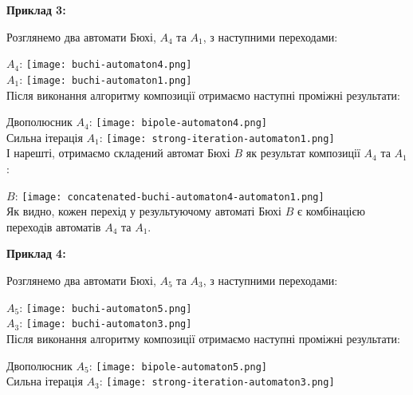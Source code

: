 \documentclass[12pt,a4paper]{article}
\begin{document}
\newpage

\vspace{1em}
\textbf{Приклад 3:}
\vspace{0.5em}

Розглянемо два автомати Бюхі, \(A_4\) та \(A_1\), з наступними переходами:

\(A_4\):
\texttt{[image: buchi-automaton4.png]} \\

\(A_1\):
\texttt{[image: buchi-automaton1.png]} \\

Після виконання алгоритму композиції отримаємо наступні проміжні результати:

Двополюсник \(A_4\):
\texttt{[image: bipole-automaton4.png]} \\

Сильна ітерація \(A_1\):
\texttt{[image: strong-iteration-automaton1.png]} \\

І нарешті, отримаємо складений автомат Бюхі \(B\) як результат композиції \(A_4\) та \(A_1\):

\(B\):
\texttt{[image: concatenated-buchi-automaton4-automaton1.png]} \\

Як видно, кожен перехід у результуючому автоматі Бюхі \(B\) є комбінацією переходів автоматів \(A_4\) та \(A_1\).

\newpage

\vspace{1em}
\textbf{Приклад 4:}
\vspace{0.5em}

Розглянемо два автомати Бюхі, \(A_5\) та \(A_3\), з наступними переходами:

\(A_5\):
\texttt{[image: buchi-automaton5.png]} \\

\(A_3\):
\texttt{[image: buchi-automaton3.png]} \\

Після виконання алгоритму композиції отримаємо наступні проміжні результати:

Двополюсник \(A_5\):
\texttt{[image: bipole-automaton5.png]} \\

Сильна ітерація \(A_3\):
\texttt{[image: strong-iteration-automaton3.png]} \\
\end{document}
